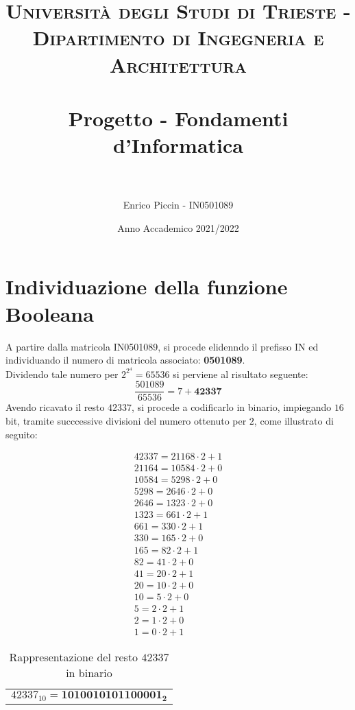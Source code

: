 \documentclass[a4paper]{extarticle}
\title{
\normalfont \normalsize
\textsc{Università degli Studi di Trieste - Dipartimento di Ingegneria e Architettura} \\[25pt]
\horrule{0.5pt} \\ [0.4cm] %
\huge Progetto - Fondamenti d'Informatica  \\ %
\horrule{2pt} \\ [0.4cm]%
}
\author{Enrico Piccin - IN0501089}
\date{Anno Accademico 2021/2022}
\begin{document}
\vspace{-10mm}
\maketitle

\tableofcontents
\newpage

\section{Individuazione della funzione Booleana}
A partire dalla matricola IN0501089, si procede elidenndo il prefisso IN ed individuando il numero di matricola associato: \textbf{0501089}.\\
Dividendo tale numero per \(2^{2^4} = 65536\) si perviene al risultato seguente:
\[\frac{501089}{65536} = 7 + \textbf{42337}\]
Avendo ricavato il resto $42337$, si procede a codificarlo in binario, impiegando $16$ bit, tramite succcessive divisioni del numero ottenuto per $2$, come illustrato di seguito:

\begin{table}[H]
  \centering
  \begin{align*}
    42337 = 21168 \cdot 2 + \boxed{1}\\
    21164 = 10584 \cdot 2 + \boxed{0}\\
    10584 = 5298  \cdot 2 + \boxed{0}\\
     5298 = 2646  \cdot 2 + \boxed{0}\\
     2646 = 1323  \cdot 2 + \boxed{0}\\
     1323 = 661   \cdot 2 + \boxed{1}\\
      661 = 330   \cdot 2 + \boxed{1}\\
      330 = 165   \cdot 2 + \boxed{0}\\
      165 = 82    \cdot 2 + \boxed{1}\\
       82 = 41    \cdot 2 + \boxed{0}\\
       41 = 20    \cdot 2 + \boxed{1}\\
       20 = 10    \cdot 2 + \boxed{0}\\
       10 = 5     \cdot 2 + \boxed{0}\\
        5 = 2     \cdot 2 + \boxed{1}\\
        2 = 1     \cdot 2 + \boxed{0}\\
        1 = 0     \cdot 2 + \boxed{1}
  \end{align*}
  \begin{tabular}{c}
    $42337_{10} = \boldsymbol{1010010101100001_2}$\\
  \end{tabular}
  \caption{Rappresentazione del resto $42337$ in binario}
  \label{tab:rappresentazione_resto_binario}
\end{table}
\end{document}
